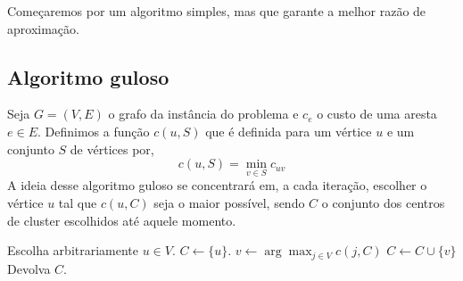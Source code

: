 \documentclass[12pt]{article}
\begin{document}
    Começaremos por um algoritmo simples, mas que garante a melhor razão de aproximação.
    
\newpage
\subsection{Algoritmo guloso}
    Seja $G = (V,E)$ o grafo da instância do problema e $c_e$ o custo de uma aresta $e \in E$.
    Definimos a função $c(u,S)$ que é definida para um vértice $u$ e um conjunto $S$ de vértices  por,
    \[ c(u,S) = \min_{v\in S} c_{uv}
        \]
    A ideia desse algoritmo guloso se concentrará em, a cada iteração, escolher o vértice $u$ tal que $c(u,C)$ seja o maior possível, sendo $C$ o conjunto dos centros de cluster escolhidos até aquele momento.

    \begin{algorithm}
		\begin{algorithmic}[1]
			\State Escolha arbitrariamente $u \in V$.
            \State $C \gets \{u\}$.
            \State $v \gets \arg\max_{j \in V} c(j,C)$
            \State $C \gets C \cup \{v\}$
            \EndWhile 
			\State Devolva $C$.
			\EndFunction
		\end{algorithmic}
	\end{algorithm}
    
\end{document}
